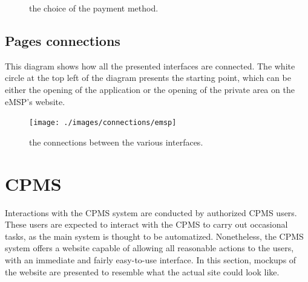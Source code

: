 \begin{figure}[h!]
    \centering
    \caption{the choice of the payment method.}
\end{figure}

\pagebreak

\subsection{Pages connections}

This diagram shows how all the presented interfaces are connected. The white circle at the top left of the diagram presents the starting point, which can be either the opening of the application or the opening of the private area on the eMSP's website.

\begin{figure}[h!]
    \centering
    \texttt{[image: ./images/connections/emsp]}
    \caption{the connections between the various interfaces.}
\end{figure}

\section{CPMS}

Interactions with the CPMS system are conducted by authorized CPMS users. These users are expected to interact with the CPMS to carry out occasional tasks, as the main system is thought to be automatized. Nonetheless, the CPMS system offers a website capable of allowing all reasonable actions to the users, with an immediate and fairly easy-to-use interface. In this section, mockups of the website are presented to resemble what the actual site could look like. 

